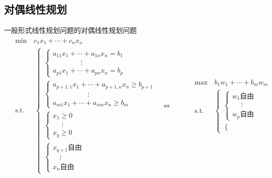 \documentclass[lang = cn, scheme = chinese, thmcnt = section]{elegantbook}
\begin{document}
\subsection{对偶线性规划}

\begin{definition}{一般形式线性规划问题的对偶线性规划问题}
	\begin{align*}
		\begin{aligned}
			& \text{min}  \quad c_1 x_1 + \cdots + c_n x_n\\
			& \text{s.t.} \;\, \quad \begin{cases}
				\begin{cases}
					a_{11} x_1 + \cdots + a_{1n} x_n = b_1 \\
					\qquad\qquad\vdots \\
					a_{p1} x_1 + \cdots + a_{pn} x_n = b_p 
				\end{cases} \\
				\begin{cases}
					a_{p+1,1} x_1 + \cdots + a_{p+1,n} x_n \ge b_{p+1}\\
					\quad\qquad\qquad\vdots \\
					a_{m1} x_1 + \cdots + a_{mn} x_n \ge b_m
				\end{cases} \\
				\begin{cases}
					x_1\ge 0 \\
					\;\quad\vdots \\
					x_q\ge 0
				\end{cases} \\
				\begin{cases}
					x_{q+1}\text{自由}\\
					\quad\vdots\\
					x_n\text{自由}
				\end{cases}
			\end{cases}
		\end{aligned}
		\iff\qquad
		\begin{aligned}
			& \text{max}  \quad b_1 w_1 + \cdots + b_m w_m\\
			& \text{s.t.} \;\, \quad \begin{cases}
				\begin{cases}
					w_1\text{自由}\\
					\;\quad\vdots\\
					w_p\text{自由}
				\end{cases}\\
				\begin{cases}

\end{cases}
\end{cases}
\end{aligned}
\end{align*}
\end{definition}
\end{document}
